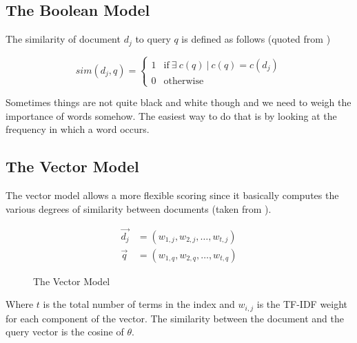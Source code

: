 \subsection*{The Boolean Model}

The similarity of document $d_j$ to query $q$ is defined as follows (quoted from \citep[p.65]{Baeza-Yates2011})

\begin{equation}
  sim(d_j,q) =
  \begin{cases}
  1 & \text{if} \ \exists \ c(q) \ | \ c(q) = c(d_j)\\
  0 & \text{otherwise}
  \end{cases}
  \label{eq:sim}
\end{equation}

Sometimes things are not quite black and white though and we need to weigh the importance of words somehow. The easiest way to do that is by looking at the frequency in which a word occurs.

\subsection*{The Vector Model}

The vector model allows a more flexible scoring since it basically computes the various degrees of similarity between documents (taken from \citep[p.78]{Baeza-Yates2011}).

\begin{equation}
  \begin{split}
  \vec{d_j} &= (w_{1,j}, w_{2,j}, \ldots, w_{t,j})\\
  \vec{q} &= (w_{1,q}, w_{2,q}, \ldots, w_{t,q})
  \end{split}
  \label{eq:vector}
\end{equation}

\begin{figure}[htb] %
  \centering
\caption[Vector Model]{The Vector Model}
\label{fig:VM}
\end{figure}

Where $t$ is the total number of terms in the index and $w_{i,j}$ is the TF-IDF weight for each component of the vector. The similarity between the document and the query vector is the cosine of $\theta$.

